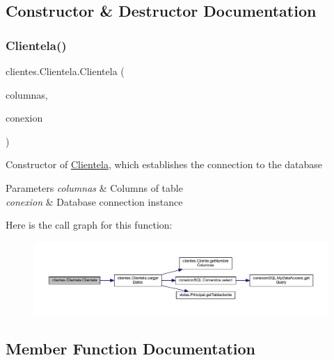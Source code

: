 \subsection{Constructor \& Destructor Documentation}
\mbox{\label{classclientes_1_1_clientela_af168d8a11882d39c22e0e18bd9689deb}} 
\subsubsection{\texorpdfstring{Clientela()}{Clientela()}}
{\footnotesize\ttfamily clientes.\+Clientela.\+Clientela (\begin{DoxyParamCaption}\item[{\mbox{\hyperlink{classclientes_1_1_modelo_columnas_tabla}{Modelo\+Columnas\+Tabla}}}]{columnas,  }\item[{\mbox{\hyperlink{classconexion_s_q_l_1_1_my_data_access}{My\+Data\+Access}}}]{conexion }\end{DoxyParamCaption})}

Constructor of \mbox{\hyperlink{classclientes_1_1_clientela}{Clientela}}, which establishes the connection to the database 
\begin{DoxyParams}{Parameters}
{\em columnas} & Columns of table \\
\hline
{\em conexion} & Database connection instance \\
\hline
\end{DoxyParams}
Here is the call graph for this function\+:\nopagebreak
\begin{figure}[H]
\begin{center}
\leavevmode
\includegraphics[width=350pt]{classclientes_1_1_clientela_af168d8a11882d39c22e0e18bd9689deb_cgraph}
\end{center}
\end{figure}


\subsection{Member Function Documentation}
\mbox{\label{classclientes_1_1_clientela_acea670c44be086472e0ccd9c3f2c1f67}} 
